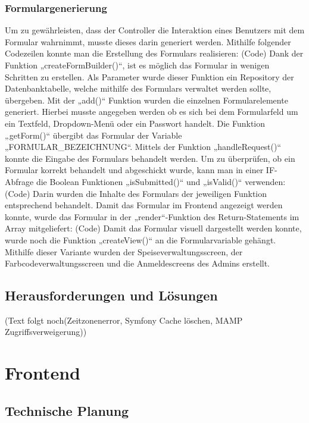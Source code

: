     \subsubsection{Formulargenerierung}

	Um zu gewährleisten, dass der Controller die Interaktion eines Benutzers mit dem Formular wahrnimmt, musste dieses darin generiert werden. Mithilfe folgender Codezeilen konnte man die Erstellung des Formulars realisieren:
	(Code)
	Dank der Funktion „createFormBuilder()“, ist es möglich das Formular in wenigen Schritten zu erstellen. Als Parameter wurde dieser Funktion ein Repository der Datenbanktabelle, welche mithilfe des Formulars verwaltet werden sollte, übergeben. Mit der „add()“ Funktion wurden die einzelnen Formularelemente generiert. Hierbei musste angegeben werden ob es sich bei dem Formularfeld um ein Textfeld, Dropdown-Menü oder ein Passwort handelt. Die Funktion „getForm()“ übergibt das Formular der Variable „FORMULAR_BEZEICHNUNG“.
	Mittels der Funktion „handleRequest()“ konnte die Eingabe des Formulars behandelt werden. Um zu überprüfen, ob ein Formular korrekt behandelt und abgeschickt wurde, kann man in einer IF-Abfrage die Boolean Funktionen „isSubmitted()“ und „isValid()“ verwenden:
	(Code)
	Darin wurden die Inhalte des Formulars der jeweiligen Funktion entsprechend behandelt.
	Damit das Formular im Frontend angezeigt werden konnte, wurde das Formular in der „render“-Funktion des Return-Statements im Array mitgeliefert:
	(Code)
	Damit das Formular visuell dargestellt werden konnte, wurde noch die Funktion „createView()“ an die Formularvariable gehängt.
	Mithilfe dieser Variante wurden der Speiseverwaltungsscreen, der Farbcodeverwaltungsscreen und die Anmeldescreens des Admins erstellt.


  \subsection{Herausforderungen und Lösungen}

	(Text folgt noch(Zeitzonenerror, Symfony Cache löschen, MAMP Zugriffsverweigerung))

\section{Frontend}

  \subsection{Technische Planung}

